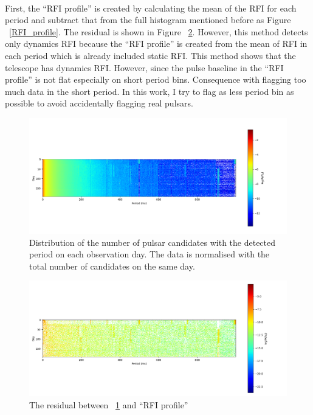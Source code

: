 \documentclass[thesis_msc.tex]{subfiles}
\begin{document}
    \paragraph{} First, the ``RFI profile'' is created by calculating the mean of the RFI for each period and subtract that from the full histogram mentioned before as Figure ~\ref{RFI_profile}. The residual is shown in Figure ~\ref{RFI_I}. However, this method detects only dynamics RFI because the ``RFI profile'' is created from the mean of RFI in each period which is already included static RFI. This method shows that the telescope has dynamics RFI. However, since the pulse baseline in the  ``RFI profile'' is not flat especially on short period bins. Consequence with flagging too much data in the short period. In this work, I try to flag as less period bin as possible to avoid accidentally flagging real pulsars. 

\begin{figure}[h!] 
\centering
\includegraphics[width=1.0\textwidth]{figures/Full_log.png}
\caption{Distribution of the number of pulsar candidates with the detected period on each observation day. The data is normalised with the total number of candidates on the same day.}
\label{RFI_II}
\end{figure}

\begin{figure}[h!] 
\centering
\includegraphics[width=1.0\textwidth]{figures/RFI_mit.png}
\caption{The residual between ~\ref{RFI_II} and ``RFI profile'' }
\label{RFI_I}
\end{figure}
\end{document}
